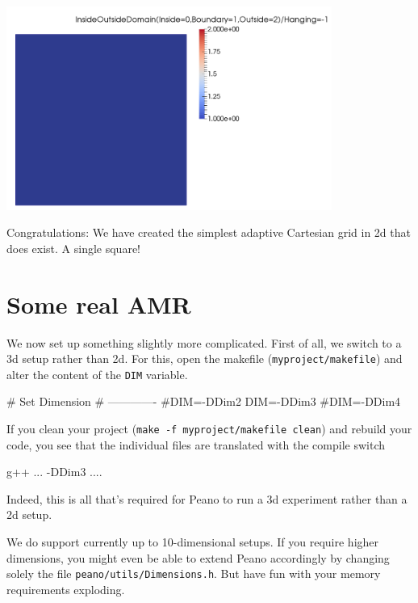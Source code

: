 \begin{center}
  \includegraphics[width=0.8\textwidth]{2_quickstart/screenshot00.png}
\end{center}

\noindent
Congratulations: We have created the simplest adaptive Cartesian grid in 2d that
does exist. A single square!


\section{Some real AMR}

We now set up something slightly more complicated. 
First of all, we switch to a 3d setup rather than 2d. 
For this, open the makefile (\texttt{myproject/makefile}) and alter the
content of the \texttt{DIM} variable.

\begin{code}
# Set Dimension
# -------------
#DIM=-DDim2
DIM=-DDim3
#DIM=-DDim4
\end{code}

\noindent
If you clean your project (\texttt{make -f myproject/makefile clean}) and
rebuild your code, you see that the individual files are translated with the
compile switch 

\begin{code}
g++ ... -DDim3 ....
\end{code}

\noindent
Indeed, this is all that's required for Peano to run a 3d experiment rather than
a 2d setup. 

\begin{remark}
We do support currently up to 10-dimensional setups. If you require higher
dimensions, you might even be able to extend Peano accordingly by changing
solely the file \texttt{peano/utils/Dimensions.h}. But have fun with your memory
requirements exploding.
\end{remark}


